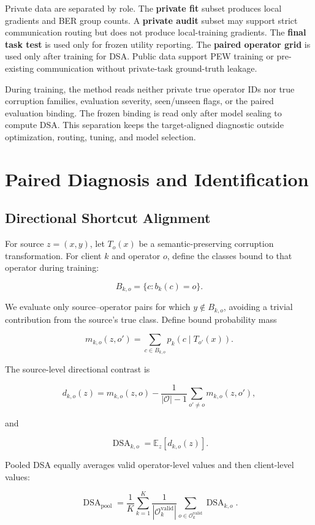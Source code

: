 Private data are separated by role. The \textbf{private fit} subset produces local gradients and BER group counts. A \textbf{private audit} subset may support strict communication routing but does not produce local-training gradients. The \textbf{final task test} is used only for frozen utility reporting. The \textbf{paired operator grid} is used only after training for DSA. Public data support PEW training or pre-existing communication without private-task ground-truth leakage.

During training, the method reads neither private true operator IDs nor true corruption families, evaluation severity, seen/unseen flags, or the paired evaluation binding. The frozen binding is read only after model sealing to compute DSA. This separation keeps the target-aligned diagnostic outside optimization, routing, tuning, and model selection.

\section{Paired Diagnosis and Identification}

\subsection{Directional Shortcut Alignment}

For source \(z=(x,y)\), let \(T_o(x)\) be a semantic-preserving corruption transformation. For client \(k\) and operator \(o\), define the classes bound to that operator during training:

\[
B_{k,o}=\{c:b_k(c)=o\}.
\]

We evaluate only source--operator pairs for which \(y\notin B_{k,o}\), avoiding a trivial contribution from the source's true class. Define bound probability mass

\[
m_{k,o}(z,o')=\sum_{c\in B_{k,o}}p_k(c\mid T_{o'}(x)).
\]

The source-level directional contrast is

\[
d_{k,o}(z)=m_{k,o}(z,o)
-\frac{1}{|\mathcal O|-1}\sum_{o'\neq o}m_{k,o}(z,o'),
\]

and

\[
\operatorname{DSA}_{k,o}=\mathbb E_z[d_{k,o}(z)].
\]

Pooled DSA equally averages valid operator-level values and then client-level values:

\[
\operatorname{DSA}_{\mathrm{pool}}
=\frac1K\sum_{k=1}^{K}
\frac1{|\mathcal O_k^{\mathrm{valid}}|}
\sum_{o\in\mathcal O_k^{\mathrm{valid}}}\operatorname{DSA}_{k,o}.
\]

